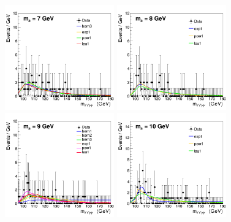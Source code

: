 \begin{figure}[htbp]
  \begin{center}
		\includegraphics[width=0.42\textwidth]{figures/chapter04/bkg_fTest/allPdfs_cat0_7.png}
        \includegraphics[width=0.42\textwidth]{figures/chapter04/bkg_fTest/allPdfs_cat0_8.png} \\
		\includegraphics[width=0.42\textwidth]{figures/chapter04/bkg_fTest/allPdfs_cat0_9.png}
		\includegraphics[width=0.42\textwidth]{figures/chapter04/bkg_fTest/allPdfs_cat0_10.png}\\

\end{center}
\end{figure}
